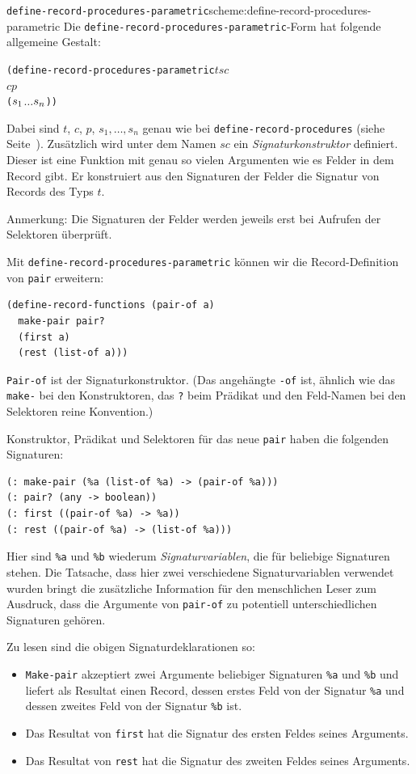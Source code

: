 \begin{feature}{\texttt{define-record-procedures-parametric}}{scheme:define-record-procedures-parametric}
%
Die \texttt{define-record-procedures-parametric}-Form hat folgende
allgemeine Gestalt:
\begin{alltt}
(define-record-procedures-parametric \(t\) \(\mathit{sc}\)
  \(c\) \(p\)
  (\(s\sb{1}\) \(\ldots\) \(s\sb{n}\)))
\end{alltt}
%
Dabei sind $t$, $c$, $p$, $s_1,\ldots, s_n$ genau wie bei
\texttt{define-record-procedures} (siehe
Seite~\pageref{def:define-record-procedures}).  Zusätzlich wird unter
dem Namen $\mathit{sc}$ ein
\textit{Signaturkonstruktor} definiert.
Dieser ist eine Funktion mit genau so vielen Argumenten wie es Felder in dem Record
gibt. Er konstruiert aus den Signaturen der Felder die Signatur von Records des Typs
$t$.

Anmerkung: Die Signaturen der Felder werden jeweils erst bei Aufrufen
der Selektoren überprüft.
\end{feature}

Mit
\texttt{define-record-procedures-parametric} können wir die
Record-Definition von \texttt{pair} erweitern:
%
\begin{verbatim}
(define-record-functions (pair-of a)
  make-pair pair?
  (first a)
  (rest (list-of a)))
\end{verbatim}
%
\texttt{Pair-of} ist der Signaturkonstruktor.  (Das angehängte
\texttt{-of} ist, ähnlich wie das \texttt{make-} bei den
Konstruktoren, das \texttt{?} beim Prädikat und den Feld-Namen bei den
Selektoren reine Konvention.)

Konstruktor, Prädikat
und Selektoren für das neue \texttt{pair} haben die folgenden
Signaturen:
%
\begin{verbatim}
(: make-pair (%a (list-of %a) -> (pair-of %a)))
(: pair? (any -> boolean))
(: first ((pair-of %a) -> %a))
(: rest ((pair-of %a) -> (list-of %a)))
\end{verbatim}
%
Hier sind  \verb|%a| und \verb|%b| wiederum
\textit{Signaturvariablen}, die für beliebige
Signaturen stehen.  Die Tatsache, dass hier zwei verschiedene Signaturvariablen
verwendet wurden bringt die zusätzliche Information für den
menschlichen Leser zum Ausdruck, dass die
Argumente von \texttt{pair-of} zu potentiell
unterschiedlichen Signaturen gehören.

Zu lesen sind die obigen Signaturdeklarationen so:
%
\begin{itemize}
\item \texttt{Make-pair} akzeptiert zwei Argumente beliebiger Signaturen
  \verb|%a| und \verb|%b| und
  liefert als Resultat einen Record, dessen erstes Feld von der Signatur
  \verb|%a| und dessen zweites Feld von der Signatur \verb|%b| ist.
\item Das Resultat von \texttt{first} hat die
  Signatur des ersten Feldes seines Arguments.
\item Das Resultat von \texttt{rest} hat die
  Signatur des zweiten Feldes seines Arguments.
\end{itemize}
%

